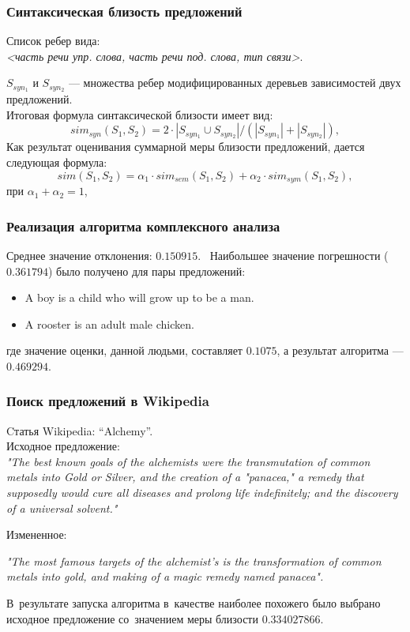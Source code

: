 \documentclass{beamer}
\begin{document}
\begin{frame}
\frametitle{Синтаксическая близость предложений}
Список ребер вида:\\

\textit{<часть речи упр. слова, часть речи под. слова, тип связи>}.

$S_{syn_1}$ и $S_{syn_2}$ --- множества ребер 
модифицированных деревьев зависимостей двух предложений.\\
\vspace{0.2cm}
Итоговая формула синтаксической близости имеет вид: 
$$sim_{syn}(S_1, S_2) = 2 \cdot |S_{syn_1} \cup S_{syn_2}| / (|S_{syn_1}| + |S_{syn_2}|),$$ 
\vspace{0.1cm}
Как результат оценивания суммарной меры близости предложений, 
дается следующая формула:
$$sim(S_1, S_2) = \alpha_1 \cdot sim_{sem}(S_1, S_2) + \alpha_2 \cdot sim_{sym}(S_1, S_2),$$
 при $\alpha_1+\alpha_2=1$,

\end{frame}


\begin{frame}
\frametitle{Реализация алгоритма комплексного анализа}

Среднее значение отклонения: $0.150915$.\
\vspace{0.1cm}
Наибольшее значение погрешности ($0.361794$) было получено для пары предложений:
\begin{itemize}
\item {
	A boy is a child who will grow up to be a man.
}
\item {
	A rooster is an adult male chicken.
}
\end{itemize}
где значение оценки, данной людьми, составляет $0.1075$, а результат алгоритма --- $0.469294$.

\end{frame}

\begin{frame}
\frametitle{Поиск предложений в Wikipedia}

\vspace{0.2cm}
Cтатья Wikipedia: ``Alchemy''.\\
Исходное предложение:\\
\textit{"The best known goals of the alchemists were the transmutation of common metals into Gold or Silver, and the creation of a "panacea," a remedy that supposedly would cure all diseases and prolong life indefinitely; and the discovery of a universal solvent."}

Измененное:

\textit{"The most famous targets of the alchemist's is the transformation of common metals into gold, and making of a magic remedy named panacea".}

В~результате запуска алгоритма в~качестве наиболее похожего 
было выбрано исходное предложение со~значением меры близости $0.334027866$.
\end{frame}
\end{document}
